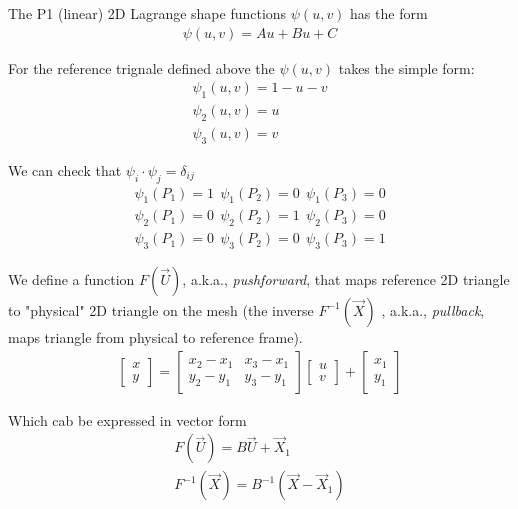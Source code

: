 \documentclass{birkjour}
\numberwithin{equation}{section}
\begin{document}
The P1 (linear) 2D Lagrange shape functions $\psi(u,v)$ has the form 
\begin{eqnarray} 
	\psi(u,v) = A u + B u + C \nonumber
\end{eqnarray}

For the reference trignale defined above the $\psi(u,v)$ takes the simple form:
\begin{eqnarray} 
	\psi_1(u,v) = 1 - u - v \nonumber\\
	\psi_2(u,v) = u \nonumber\\
	\psi_3(u,v) = v \nonumber
\end{eqnarray}

We can check that $\psi_i \cdot \psi_j = \delta_{ij}$
\begin{eqnarray} 
\psi_1(P_1) = 1 \ \  \psi_1(P_2) = 0  \ \  \psi_1(P_3) = 0 \nonumber\\
\psi_2(P_1) = 0 \ \  \psi_2(P_2) = 1  \ \  \psi_2(P_3) = 0 \nonumber\\
\psi_3(P_1) = 0 \ \  \psi_3(P_2) = 0  \ \  \psi_3(P_3) = 1 \nonumber
\end{eqnarray}

We define a function $F(\vec U)$, a.k.a., \emph{pushforward}, that maps reference 2D triangle to "physical" 2D triangle on the mesh
(the inverse $F^{-1}(\vec X)$ , a.k.a., \emph{pullback}, maps triangle from physical to reference frame).
\begin{eqnarray}
	\left[\begin{array}{c}
		x \\
		y
	\end{array}\right] = 
	\left[\begin{array}{cc}
		x_2 - x_1 &  x_3 - x_1 \\
		y_2 - y_1 &  y_3 - y_1
	\end{array}\right] 
	\left[\begin{array}{c}
		u \\
		v
	\end{array}\right] +
	\left[\begin{array}{c}
		x_1 \\
		y_1
	\end{array}\right] \nonumber
\end{eqnarray}

Which cab be expressed in vector form
\begin{eqnarray} 
	F(\vec U) =  B \vec U + \vec X_1 \nonumber\\
	F^{-1}(\vec X)  = B^{-1} (\vec X - \vec X_1) \nonumber
\end{eqnarray}
\end{document}
